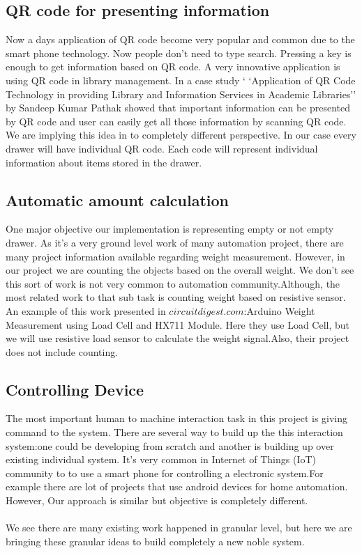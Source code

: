\documentclass{sigchi}
\begin{document}
\subsection{QR code for presenting information}
Now a days application of QR code become very popular and common due to the smart phone technology. Now people don't need to type search. Pressing a key is enough to get information based on QR code. A very innovative application is using QR code in library management. In a case study ` `Application of QR Code Technology in providing Library and Information Services in Academic Libraries'' by  Sandeep
Kumar Pathak showed that important information can be presented by QR code and user can easily get all those information by scanning QR code. 
We are implying this idea in to completely different perspective. In our case every drawer will have individual QR code. Each code will represent individual information about items stored in the drawer. 
\subsection{Automatic amount calculation}
One major objective our implementation is representing empty or not empty drawer. As it's a very ground level work of many automation project, there are many project information available regarding weight measurement. However, in our project we are counting the objects based on the overall weight. We don't see this sort of work is not very common to automation community.Although, the most related work to that sub task is counting weight based on resistive sensor. An example of this work presented in $circuitdigest.com$:Arduino Weight Measurement using Load Cell and HX711 Module. Here they use Load Cell, but we will use resistive load sensor to calculate the weight signal.Also, their project does not include counting.
\subsection{Controlling Device}
The most important human to machine interaction task in this project is giving command to the system. There are several way to build up the this interaction system:one could be developing from scratch and another is building up over existing individual system. It's very common in Internet of Things (IoT) community to to use a smart phone for controlling a electronic system.For example there are lot of projects that use android devices for home automation. However, Our approach is similar but objective is completely different.
\\
\\
We see there are many existing work happened in granular level, but here we are bringing these granular ideas to build completely a new noble system.
\end{document}
